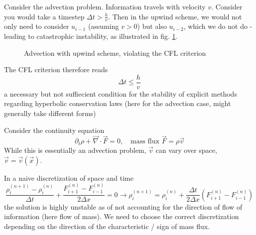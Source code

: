 Consider the advection problem. Information travels with velocity $v$. Consider you would
take a timestep $\Delta t > \frac{h}{v}$. Then in the upwind scheme, we would not only
need to consider $u_{i-1}$ (assuming $v > 0$) but also $u_{i-2}$, which we do not do - leading
to catastrophic instability, as illustrated in fig. \ref{fig:advection_cfl}.

\begin{figure}[htb!]
    \centering
    
    \caption{Advection with upwind scheme, violating the CFL criterion}
    \label{fig:advection_cfl}
\end{figure}

\begin{mdframed}
The CFL criterion therefore reads
\begin{equation}
    \Delta t \leq \frac{h}{v}
\end{equation}
a necessary but not suffiecient condition for the stability of explicit methods regarding
hyperbolic conservation laws (here for the advection case, might generally take different forms)
\end{mdframed}


Consider the continuity equation
\begin{equation}
    \partial_t \rho + \vec{\nabla} \cdot \vec{F} = 0, \quad \text{mass flux } \vec{F} = \rho \vec{v}
\end{equation}
While this is essentially an advection problem, $\vec{v}$ can vary over space, $\vec{v} = \vec{v}(\vec{x})$.

In a naive discretization of space and time
\begin{equation}
    \frac{\rho_i^{(n+1)}-\rho_i^{(n)}}{\Delta t}+\frac{F_{i+1}^{(n)}-F_{i-1}^{(n)}}{2 \Delta x}=0 \rightarrow \rho_i^{(n+1)}=\rho_i^{(n)}+\frac{\Delta t}{2 \Delta x}\left(F_{i+1}^{(n)}-F_{i-1}^{(n)}\right)
\end{equation}
\textcolor{red1}{the solution is highly unstable as of not accounting for the direction
of flow of information (here flow of mass)}. We need to \textcolor{green1}{choose the
correct discretization} depending on the direction of the characteristic / sign of mass flux.

